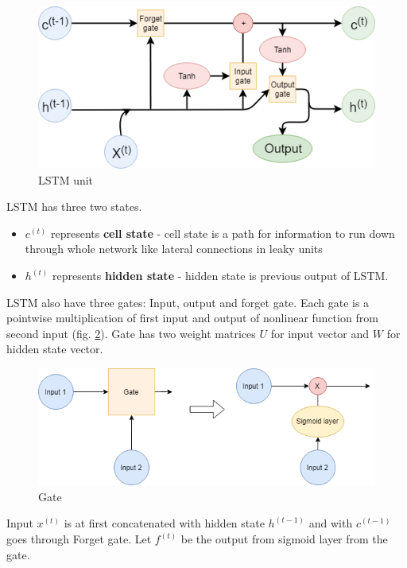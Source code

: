\begin{figure}[!h]
    \centering
    \includegraphics[width=140mm]{chapters/images/LSTM.png}
    \caption{LSTM unit}
    \label{fig:LSTM}
\end{figure}

LSTM has three two states. 
\begin{itemize}
    \item $c^{(t)}$ represents \textbf{cell state} - cell state is a path for information to run down through whole network like lateral connections in leaky units
    \item $h^{(t)}$ represents \textbf{hidden state} - hidden state is previous output of LSTM.
\end{itemize}

LSTM also have three gates: Input, output and forget gate. Each gate is a pointwise multiplication of first input and output of nonlinear function from second input (fig. \ref{fig:LSTM_gate}). Gate has two weight matrices $U$ for input vector and $W$ for hidden state vector.


\begin{figure}[!h]
    \centering
    \includegraphics[width=120mm]{chapters/images/LSTM_gate.png}
    \caption{Gate}
    \label{fig:LSTM_gate}
\end{figure}

Input $x^{(t)}$ is at first concatenated with hidden state $h^{(t-1)}$ and with $c^{(t-1)}$ goes through Forget gate. Let $f^{(t)}$ be the output from sigmoid layer from the gate.

